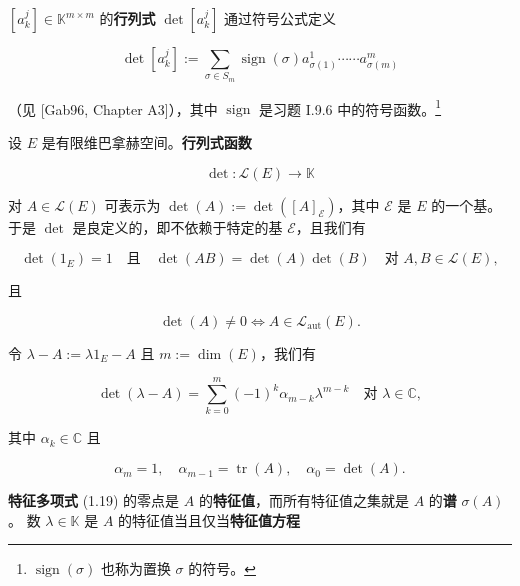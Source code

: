 \begin{remark}

\begin{items}
\item

$ [a_{k}^{j}] \in \mathbb{K}^{m\times m} $ 的\textbf{行列式} $ \det[a_{k}^{j}] $ 通过符号公式定义

\[
\det[a_{k}^{j}] := \sum_{\sigma \in S_{m}}\operatorname{sign}(\sigma)a_{\sigma(1)}^{1} \cdots\cdots a_{\sigma(m)}^{m}
\]

（见 [Gab96, Chapter A3]），其中 $ \operatorname{sign} $ 是习题 I.9.6 中的符号函数。\footnote{$ \operatorname{sign}(\sigma) $ 也称为置换 $ \sigma $ 的符号。}

\item

设 $ E $ 是有限维巴拿赫空间。\textbf{行列式函数}

\[
\det : \mathcal{L}(E) \to \mathbb{K}
\]

对 $ A \in \mathcal{L}(E) $ 可表示为 $ \det(A) := \det([A]_{\mathcal{E}}) $，其中 $ \mathcal{E} $ 是 $ E $ 的一个基。于是 $ \det $ 是良定义的，即不依赖于特定的基 $ \mathcal{E} $，且我们有

\begin{equation}
\det(1_{E}) = 1 \quad \text{且} \quad \det(AB) = \det(A)\det(B) \quad \text{对 } A, B \in \mathcal{L}(E) ,\tag{1.17}
\end{equation}

且

\begin{equation}
\det(A) \ne 0 \iff A \in \mathcal{L}_{\mathrm{aut}}(E) .\tag{1.18}
\end{equation}

令 $ \lambda - A := \lambda 1_{E} - A $ 且 $ m := \dim(E) $，我们有

\begin{equation}
\det(\lambda - A) = \sum_{k=0}^{m}(-1)^{k}\alpha_{m-k}\lambda^{m-k} \quad \text{对 } \lambda \in \mathbb{C} ,\tag{1.19}
\end{equation}

其中 $ \alpha_{k} \in \mathbb{C} $ 且

\begin{equation}
\alpha_{m} = 1 , \quad \alpha_{m-1} = \operatorname{tr}(A) , \quad \alpha_{0} = \det(A) .\tag{1.20}
\end{equation}

\textbf{特征多项式} (1.19) 的零点是 $ A $ 的\textbf{特征值}，而所有特征值之集就是 $ A $ 的\textbf{谱} $ \sigma(A) $。
数 $ \lambda \in \mathbb{K} $ 是 $ A $ 的特征值当且仅当\textbf{特征值方程}


\end{items}
\end{remark}
